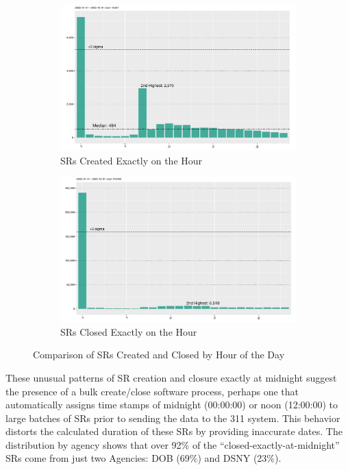 \documentclass[linenumber]{jdsart}
\begin{document}
\begin{figure}[tbp]
    \centering
    \begin{subfigure}{\textwidth}
        \centering
        \includegraphics[width=\textwidth]{2-year-trend_SRs_created_on_the_hour.pdf}
        \caption{SRs Created Exactly on the Hour}
        \label{fig:busiestcreated}
    \end{subfigure}
    \par\medskip
    \begin{subfigure}{\textwidth}
        \centering
        \includegraphics[width=\textwidth]{2-year-trend_SRs_closed_on_the_hour.pdf}
        \caption{SRs Closed Exactly on the Hour}
        \label{fig:busiestclosed}
    \end{subfigure}
    \caption{Comparison of SRs Created and Closed by Hour of the Day}
    \label{fig:stacked}
\end{figure}

These unusual patterns of SR creation and closure exactly at midnight 
suggest the presence of a bulk create/close software process, perhaps one
that automatically assigns time stamps of midnight (00:00:00) or noon 
(12:00:00) to large batches of SRs prior to sending the data to the 311 
system. This behavior distorts the calculated duration of these 
SRs by providing inaccurate dates. The distribution by agency 
shows that over 92\% of the ``closed-exactly-at-midnight'' 
SRs come from just two Agencies: DOB (69\%) and DSNY  (23\%).
\end{document}
